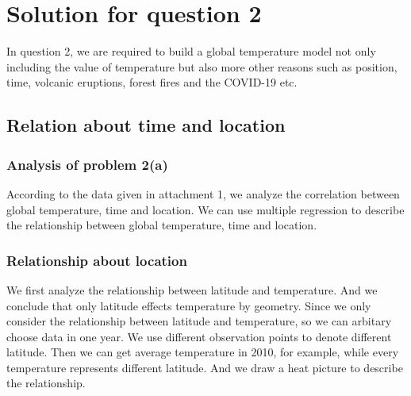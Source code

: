 \documentclass{apmcmthesis}
\begin{document}
  \section{Solution for question 2}
  In question 2, we are required to build a global temperature model not only including the value of temperature 
  but also more other reasons such as position, time, volcanic eruptions, forest fires and the COVID-19 etc.
  
  \subsection{Relation about time and location}
  \subsubsection{Analysis of problem 2(a)}
  According to the data given in attachment 1, we analyze the correlation between global temperature, time and location.
  We can use multiple regression to describe the relationship between global temperature, time and location. 
  
  \subsubsection{Relationship about location}
  We first analyze the relationship between latitude and temperature. 
  And we conclude that only latitude effects temperature by geometry.
  Since we only consider the relationship between latitude and temperature, so we can arbitary choose data in one year.
  We use different observation points to denote different latitude.
  Then we can get average temperature in 2010, for example, while every temperature represents different latitude. 
  And we draw a heat picture to describe the relationship.
  
\end{document}
